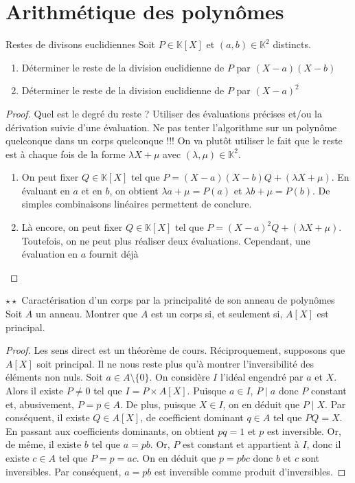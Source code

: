 \documentclass[french,a4paper]{article}
\newcommand{\K}{\mathbb{K}}
\theoremstyle{plain}
\theoremstyle{definition}
\theoremstyle{remark}
\begin{document}
\section{Arithmétique des polynômes}

\begin{ex}{Restes de divisons euclidiennes}
	Soit $P \in \K[X]$ et $(a,b) \in\K^2$ distincts. 
	\begin{enumerate}
		\item Déterminer le reste de la division euclidienne de $P$ par $(X-a)(X-b)$
		\item Déterminer le reste de la division euclidienne de $P$ par $(X-a)^2$
	\end{enumerate}
\end{ex}
\begin{proof}
	Quel est le degré du reste ? Utiliser des évaluations précises et/ou la dérivation suivie d'une évaluation. Ne pas tenter l'algorithme sur un polynôme quelconque dans un corps quelconque !!! On va plutôt utiliser le fait que le reste est à chaque fois de la forme $\lambda X + \mu$ avec $(\lambda,\mu) \in \K^2$.
	\begin{enumerate}
		\item On peut fixer $Q \in\K[X]$ tel que $P=(X-a)(X-b)Q + (\lambda X + \mu)$. En évaluant en $a$ et en $b$, on obtient $\lambda a + \mu =P(a)$ et $\lambda b + \mu = P(b)$. De simples combinaisons linéaires permettent de conclure.
		\item Là encore, on peut fixer $Q \in\K[X]$ tel que $P=(X-a)^2Q + (\lambda X + \mu)$. Toutefois, on ne peut plus réaliser deux évaluations. Cependant, une évaluation en $a$ fournit déjà
	\end{enumerate}
\end{proof}

\begin{ex}{$\star\star$ Caractérisation d'un corps par la principalité de son anneau de polynômes}
	Soit $A$ un anneau. Montrer que $A$ est un corps si, et seulement si, $A[X]$ est principal.
\end{ex}
\begin{proof}
	Les sens direct est un théorème de cours. Réciproquement, supposons que $A[X]$ soit principal. Il ne nous reste plus qu'à montrer l'inversibilité des éléments non nuls. Soit $a\in A\setminus\{0\}$. On considère $I$ l'idéal engendré par $a$ et $X$. Alors il existe $P\ne 0$ tel que $I=P\times A[X]$. Puisque $a\in I$, $P\mid a$ donc $P$ constant et, abusivement, $P=p\in A$. De plus, puisque $X\in I$, on en déduit que $P\mid X$. Par conséquent, il existe $Q\in A[X]$, de coefficient dominant $q\in A$ tel que $PQ=X$. En passant aux coefficients dominants, on obtient $pq=1$ et $p$ est inversible. Or, de même, il existe $b$ tel que $a=pb$. Or, $P$ est constant et appartient à $I$, donc il existe $c\in A$ tel que $P=p=ac$. On en déduit que $p=pbc$ donc $b$ et $c$ sont inversibles.  Par conséquent, $a=pb$ est inversible comme produit d'inversibles. 
\end{proof}
\end{document}
